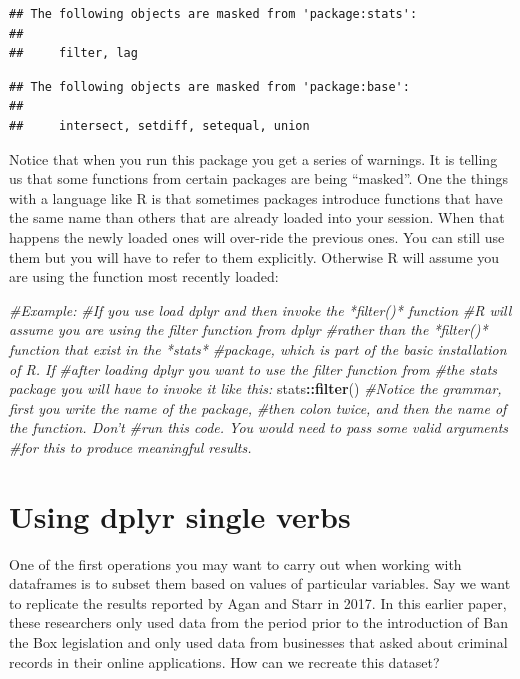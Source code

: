 \documentclass[]{book}
\newenvironment{Shaded}{\begin{snugshade}}{\end{snugshade}}
\newcommand{\CommentTok}[1]{\textcolor[rgb]{0.56,0.35,0.01}{\textit{#1}}}
\newcommand{\KeywordTok}[1]{\textcolor[rgb]{0.13,0.29,0.53}{\textbf{#1}}}
\newcommand{\NormalTok}[1]{#1}
\newcommand{\OperatorTok}[1]{\textcolor[rgb]{0.81,0.36,0.00}{\textbf{#1}}}
\theoremstyle{definition}
\theoremstyle{definition}
\theoremstyle{definition}
\theoremstyle{remark}
\begin{document}
\begin{verbatim}
## The following objects are masked from 'package:stats':
## 
##     filter, lag
\end{verbatim}

\begin{verbatim}
## The following objects are masked from 'package:base':
## 
##     intersect, setdiff, setequal, union
\end{verbatim}

Notice that when you run this package you get a series of warnings. It
is telling us that some functions from certain packages are being
``masked''. One the things with a language like R is that sometimes
packages introduce functions that have the same name than others that
are already loaded into your session. When that happens the newly loaded
ones will over-ride the previous ones. You can still use them but you
will have to refer to them explicitly. Otherwise R will assume you are
using the function most recently loaded:

\begin{Shaded}
\begin{Highlighting}[]
\CommentTok{#Example:}
\CommentTok{#If you use load dplyr and then invoke the *filter()* function}
\CommentTok{#R will assume you are using the filter function from dplyr}
\CommentTok{#rather than the *filter()* function that exist in the *stats*}
\CommentTok{#package, which is part of the basic installation of R. If }
\CommentTok{#after loading dplyr you want to use the filter function from}
\CommentTok{#the stats package you will have to invoke it like this:}
\NormalTok{stats}\OperatorTok{::}\KeywordTok{filter}\NormalTok{()}
\CommentTok{#Notice the grammar, first you write the name of the package,}
\CommentTok{#then colon twice, and then the name of the function. Don't }
\CommentTok{#run this code. You would need to pass some valid arguments}
\CommentTok{#for this to produce meaningful results.}
\end{Highlighting}
\end{Shaded}

\hypertarget{using-dplyr-single-verbs}{%
\section{Using dplyr single verbs}\label{using-dplyr-single-verbs}}

One of the first operations you may want to carry out when working with
dataframes is to subset them based on values of particular variables.
Say we want to replicate the results reported by Agan and Starr in 2017.
In this earlier paper, these researchers only used data from the period
prior to the introduction of Ban the Box legislation and only used data
from businesses that asked about criminal records in their online
applications. How can we recreate this dataset?
\end{document}
